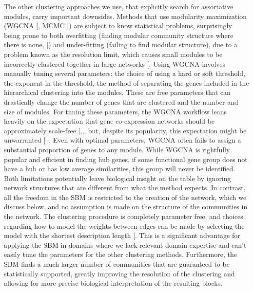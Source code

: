 \documentclass[
]{article}
\begin{document}
The other clustering approaches we use, that explicitly search for
assortative modules, carry important downsides. Methods that use
modularity maximization (WGCNA
{[}\citeproc{ref-Langfelder2008-qa}{3}{]}, MCMC
{[}\citeproc{ref-Stone2009-hv}{11}{]}) are subject to know statistical
problems, surprisingly being prone to both overfitting (finding modular
community structure where there is none,
{[}\citeproc{ref-Guimera2004-jq}{25}{]}) and under-fitting (failing to
find modular structure), due to a problem known as the resolution limit,
which causes small modules to be incorrectly clustered together in large
networks {[}\citeproc{ref-Fortunato2007-ao}{33}{]}. Using WGCNA involves
manually tuning several parameters: the choice of using a hard or soft
threshold, the exponent in the threshold, the method of separating the
genes included in the hierarchical clustering into the modules. These
are free parameters that can drastically change the number of genes that
are clustered and the number and size of modules. For tuning these
parameters, the WGCNA workflow leans heavily on the expectation that
gene co-expression networks should be approximately scale-free
{[},,\citeproc{ref-Jeong2000-xe}{35}{]},
but, despite its popularity, this expectation might be unwarranted
{[}--\citeproc{ref-Keller2005-nf}{39}{]}.
Even with optimal parameters, WGCNA often fails to assign a substantial
proportion of genes to any module. While WGCNA is rightfully popular and
efficient in finding hub genes, if some functional gene group does not
have a hub or has low average similarities, this group will never be
identified. Both limitations potentially leave biological insight on the
table by ignoring network structures that are different from what the
method expects. In contrast, all the freedom in the SBM is restricted to
the creation of the network, which we discuss below, and no assumption
is made on the structure of the communities in the network. The
clustering procedure is completely parameter free, and choices regarding
how to model the weights between edges can be made by selecting the
model with the shortest description length
{[}\citeproc{ref-Peixoto2017-zw}{15}{]}. This is a significant advantage
for applying the SBM in domains where we lack relevant domain expertise
and can't easily tune the parameters for the other clustering methods.
Furthermore, the SBM finds a much larger number of communities that are
guaranteed to be statistically supported, greatly improving the
resolution of the clustering and allowing for more precise biological
interpretation of the resulting blocks.
\end{document}
